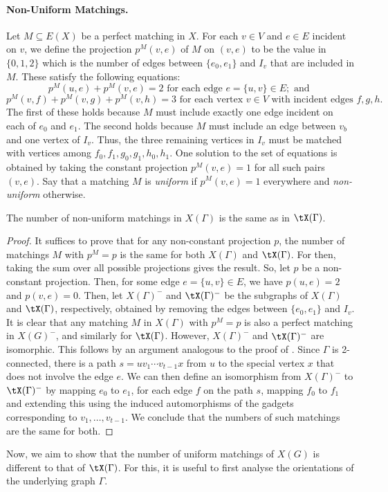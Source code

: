 \documentclass{toc}
\begin{document}
\paragraph{Non-Uniform Matchings.}
Let $M \subseteq E(X)$ be a perfect matching in $X$. For each $v \in V$ and $e
\in E$ incident on $v$, we define the projection $p^M(v,e)$ of $M$ on $(v,e)$ to
be the value in $\{0,1,2\}$ which is the number of edges between $\{e_0,e_1\}$
and $I_v$ that are included in $M$. These satisfy the following equations:
$$p^M(u,e) + p^M(v,e) = 2 \text{ for each edge } e = \{u,v\} \in E; \text{ and }$$
$$p^M(v,f) + p^M(v,g) + p^M(v,h) = 3 \text{ for each vertex } v \in V \text{ with incident edges } f,g,h.$$
The first of these holds because $M$ must include exactly one edge incident on
each of $e_0$ and $e_1$. The second holds because $M$ must include an edge
between $v_b$ and one vertex of $I_v$. Thus, the three remaining vertices in
$I_v$ must be matched with vertices among $f_0,f_1,g_0,g_1,h_0,h_1$.
One solution to the set of equations is obtained by taking the constant
projection $p^M(v,e) = 1$ for all such pairs $(v,e)$. Say that a matching $M$ is
\emph{uniform} if $p^M(v,e) = 1$ everywhere and \emph{non-uniform} otherwise.
\begin{lemma}\label{lem:non-uniform}
  The number of non-uniform matchings in $X(\Gamma)$ is the same as in $\tX(\Gamma)$.
\end{lemma}
\begin{proof}
  It suffices to prove that for any non-constant projection $p$, the number of
  matchings $M$ with $p^{M} = p$ is the same for both $X(\Gamma)$ and $\tX(\Gamma)$. For
  then, taking the sum over all possible projections gives the result. So, let
  $p$ be a non-constant projection. Then, for some edge $e = \{u,v\} \in E$, we
  have $p(u,e) = 2$ and $p(v,e) = 0$. Then, let $X(\Gamma)^-$ and $\tX(\Gamma)^-$ be the
  subgraphs of $X(\Gamma)$ and $\tX(\Gamma)$, 
  respectively, %
  obtained by removing the edges
  between $\{e_0,e_1\}$ and $I_v$. It is clear that any matching $M$ in $X(\Gamma)$
  with $p^{M} = p$ is also a perfect matching in $X(G)^-$, and similarly for
  $\tX(\Gamma)$. However, $X(\Gamma)^-$ and $\tX(\Gamma)^-$ are isomorphic. This follows by an
  argument analogous to the proof of . Since $\Gamma$ is
  2-connected, there is a path $s = uv_1\cdots v_{t-1}x$ from $u$ to the special vertex $x$ that does
  not involve the edge $e$. We can then define an isomorphism from $X(\Gamma)^-$ to
  $\tX(\Gamma)^-$ by mapping $e_0$ to $e_1$, for each edge $f$ on the path $s$, mapping
  $f_0$ to $f_1$ and extending this using the induced automorphisms of the
  gadgets corresponding to $v_1,\ldots,v_{t-1}$. We conclude that the numbers of
  such matchings are the same for both.
\end{proof}
Now, we aim to show that the number of uniform matchings of $X(G)$ is different
to that of $\tX(\Gamma)$. For this, it is useful to first analyse the orientations of
the underlying graph $\Gamma$.
\end{document}
